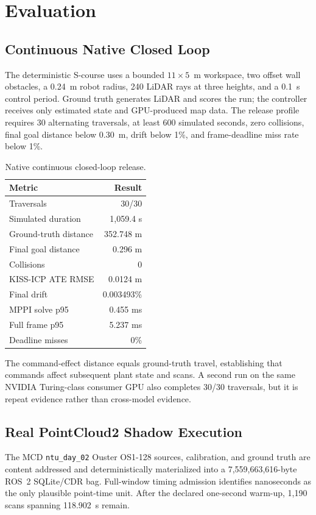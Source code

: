 \documentclass[conference]{IEEEtran}
\begin{document}
\section{Evaluation}
\subsection{Continuous Native Closed Loop}
The deterministic S-course uses a bounded $11\times5$~m workspace, two
offset wall obstacles, a 0.24~m robot radius, 240 LiDAR rays at three heights,
and a 0.1~s control period. Ground truth generates LiDAR and scores the run;
the controller receives only estimated state and GPU-produced map data. The
release profile requires 30 alternating traversals, at least 600 simulated
seconds, zero collisions, final goal distance below 0.30~m, drift below 1\%,
and frame-deadline miss rate below 1\%.

\begin{table}[t]
\centering
\caption{Native continuous closed-loop release.}
\label{tab:native}
\small
\begin{tabular}{lr}
\toprule
Metric & Result \\
\midrule
Traversals & 30/30 \\
Simulated duration & 1,059.4 s \\
Ground-truth distance & 352.748 m \\
Final goal distance & 0.296 m \\
Collisions & 0 \\
KISS-ICP ATE RMSE & 0.0124 m \\
Final drift & 0.003493\% \\
MPPI solve p95 & 0.455 ms \\
Full frame p95 & 5.237 ms \\
Deadline misses & 0\% \\
\bottomrule
\end{tabular}
\end{table}
The command-effect distance equals ground-truth travel, establishing that
commands affect subsequent plant state and scans. A second run on the same NVIDIA Turing-class consumer GPU also completes 30/30 traversals, but it is repeat evidence rather than
cross-model evidence.

\subsection{Real PointCloud2 Shadow Execution}
The MCD \texttt{ntu\_day\_02} Ouster OS1-128 sources, calibration, and ground
truth are content addressed and deterministically materialized into a
7,559,663,616-byte ROS~2 SQLite/CDR bag. Full-window timing admission identifies
nanoseconds as the only plausible point-time unit. After the declared
one-second warm-up, 1,190 scans spanning 118.902~s remain.
\end{document}

